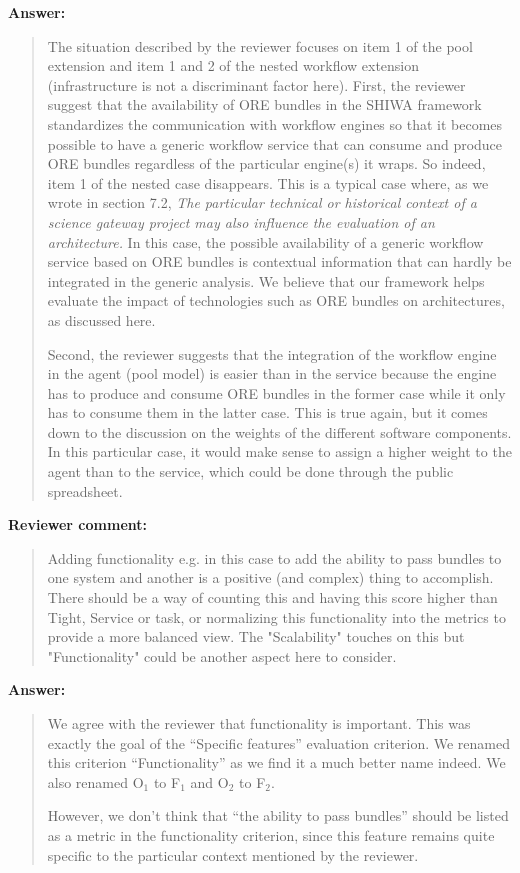\documentclass[a4]{article}
\newenvironment{review}%
{\textbf{Reviewer comment:}\begin{quote}}%
{\end{quote}}%
\newenvironment{answer}%
{\textbf{Answer:}\begin{small}\begin{quote}}%
{\end{quote}\end{small}}%
\newcommand{\revised}[1]{\color{blue} #1\color{black}\xspace}
\begin{document}
\begin{answer}
The situation described by the reviewer focuses on item 1 of the pool
extension and item 1 and 2 of the nested workflow extension
(infrastructure is not a discriminant factor here). First, the
reviewer suggest that the availability of ORE bundles in the SHIWA
framework standardizes the communication with workflow engines so that
it becomes possible to have a generic workflow service that can
consume and produce ORE bundles regardless of the particular engine(s)
it wraps. So indeed, item 1 of the nested case disappears. This is a
typical case where, as we wrote in section 7.2, \emph{The particular
technical or historical context of a science gateway project may also
influence the \revised{evaluation} of an architecture.} In this
case, the possible availability of a generic workflow service based on
ORE bundles is contextual information that can hardly be integrated in
the generic analysis. We believe that our framework helps evaluate
the impact of technologies such as ORE bundles on architectures, as
discussed here.

Second, the
reviewer suggests that the integration of the workflow engine in the
agent (pool model) is easier than in the service because the engine
has to produce and consume ORE bundles in the former case while it
only has to consume them in the latter case. This is true again, but
it comes down to the discussion on the weights of the different
software components. In this particular case, it would make sense to
assign a higher weight to the agent than to the service, which could
be done through the public spreadsheet.  
\end{answer}

\begin{review}
  Adding functionality e.g. in this case to add the ability to pass
  bundles to one system and another is a positive (and complex) thing
  to accomplish. There should be a way of counting this and having
  this score higher than Tight, Service or task, or normalizing this
  functionality into the metrics to provide a more balanced view. The
  "Scalability" touches on this but "Functionality" could be another
  aspect here to consider.
\end{review}

\begin{answer}
  We agree with the reviewer that functionality is important. This was
  exactly the goal of the ``Specific features'' evaluation
  criterion. We renamed this criterion ``Functionality'' as we find it
  a much better name indeed. We also renamed O$_1$ to F$_1$ and O$_2$
  to F$_2$. 

  However, we don't think that ``the ability to pass bundles'' should
  be listed as a metric in the functionality criterion, since this
  feature remains quite specific to the particular context mentioned
  by the reviewer. 
\end{answer}
\end{document}
